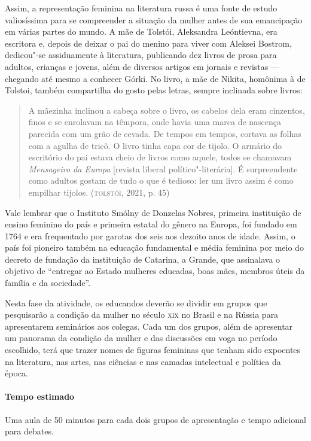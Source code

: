 \documentclass[11pt]{extarticle}
\begin{document}
Assim, a representação feminina na literatura russa é uma fonte de
estudo valiosíssima para se compreender a situação da mulher antes de
sua emancipação em várias partes do mundo. A mãe de Tolstói, Aleksandra
Leóntievna, era escritora e, depois de deixar o pai do menino para viver
com Aleksei Bostrom, dedicou"-se assiduamente à literatura, publicando
dez livros de prosa para adultos, crianças e jovens, além de diversos
artigos em jornais e revistas --- chegando até mesmo a conhecer Górki.
No livro, a mãe de Nikita, homônima à de Tolstoi, também compartilha do
gosto pelas letras, sempre inclinada sobre livros:

\begin{quote}
A mãezinha inclinou a cabeça sobre o livro, os cabelos dela eram
cinzentos, finos e se enrolavam na têmpora, onde havia uma marca de
nascença parecida com um grão de cevada. De tempos em tempos, cortava as
folhas com a agulha de tricô. O livro tinha capa cor de tijolo. O
armário do escritório do pai estava cheio de livros como aquele, todos
se chamavam \emph{Mensageiro da Europa} {[}revista liberal
político"-literária{]}. É surpreendente como adultos gostam de tudo o que
é tedioso: ler um livro assim é como empilhar tijolos. (\textsc{tolstói}, 2021,
p. 45)
\end{quote}

Vale lembrar que o Instituto Smólny de Donzelas Nobres, primeira
instituição de ensino feminino do país e primeira estatal do gênero na
Europa, foi fundado em 1764 e era frequentado por garotas dos seis aos
dezoito anos de idade. Assim, o país foi pioneiro também na educação
fundamental e média feminina por meio do decreto de fundação da
instituição de Catarina, a Grande, que assinalava o objetivo de
``entregar ao Estado mulheres educadas, boas mães, membros úteis da
família e da sociedade''.


Nesta fase da atividade, os educandos deverão se dividir em grupos que
pesquisarão a condição da mulher no século \textsc{xix} no Brasil e na Rússia
para apresentarem seminários aos colegas. Cada um dos grupos, além de
apresentar um panorama da condição da mulher e das discussões em voga no
período escolhido, terá que trazer nomes de figuras femininas que tenham
sido expoentes na literatura, nas artes, nas ciências e nas camadas
intelectual e política da época.

\paragraph{Tempo estimado} Uma aula de 50 minutos para cada dois grupos de
apresentação e tempo adicional para debates.
\end{document}
